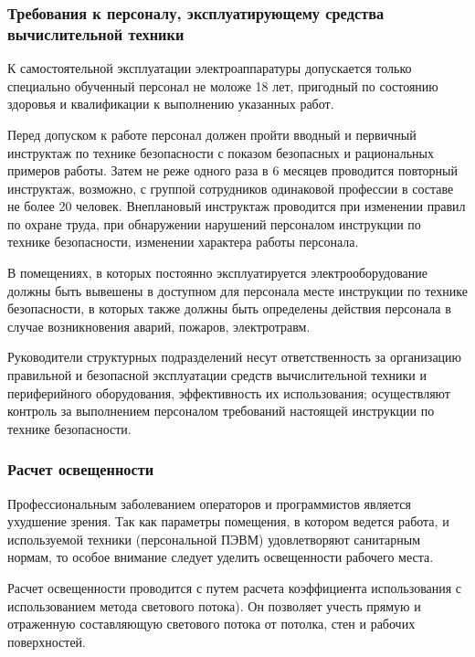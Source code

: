 \subsubsection{Требования к персоналу, эксплуатирующему средства вычислительной техники}

К самостоятельной эксплуатации электроаппаратуры допускается только специально обученный персонал не моложе 18 лет, пригодный по состоянию здоровья и квалификации к выполнению указанных работ.

Перед допуском к работе персонал должен пройти вводный и первичный инструктаж по технике безопасности с показом безопасных и рациональных примеров работы. Затем не реже одного раза в 6 месяцев проводится повторный инструктаж, возможно, с группой сотрудников одинаковой профессии в составе не более 20 человек. Внеплановый инструктаж проводится при изменении правил по охране труда, при обнаружении нарушений персоналом инструкции по технике безопасности, изменении характера работы персонала.

В помещениях, в которых постоянно эксплуатируется электрооборудование должны быть вывешены в доступном для персонала месте инструкции по технике безопасности, в которых также должны быть определены действия персонала в случае возникновения аварий, пожаров, электротравм.

Руководители структурных подразделений несут ответственность за организацию правильной и безопасной эксплуатации средств вычислительной техники и периферийного оборудования, эффективность их использования; осуществляют контроль за выполнением персоналом требований настоящей инструкции по технике безопасности.

\subsubsection{Расчет освещенности}

Профессиональным заболеванием операторов и программистов является ухудшение зрения.
Так как параметры помещения, в котором ведется работа, и используемой техники (персональной ПЭВМ) удовлетворяют санитарным нормам, то особое внимание следует уделить освещенности рабочего места.

Расчет освещенности проводится с путем расчета коэффициента использования с использованием метода светового потока).
Он позволяет учесть прямую и отраженную составляющую светового потока от потолка, стен и рабочих поверхностей.

